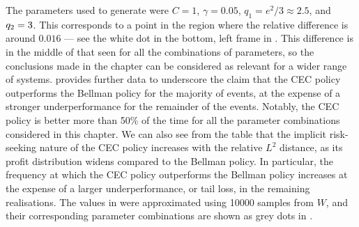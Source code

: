 \documentclass[main.tex]{subfiles}
\begin{document}
The parameters used to generate 
were $C=1$, $\gamma=0.05$, $q_1=e^2/3\approx2.5$, and
$q_2=\nobreak3$. This corresponds to a point
in the region where the relative difference is around $0.016$ --- see the
white dot in the
bottom, left frame in .
This difference is in the middle of that seen for all the
combinations of parameters, so the conclusions made in the chapter
can be considered as relevant for a wider range of systems.
 provides further data to underscore
the claim that the CEC policy
outperforms the Bellman policy for the
majority of events, at the expense of a stronger underperformance
for the remainder of the events. Notably, the CEC policy is better
more than 50\% of the time for all the parameter
combinations considered in this chapter.
We can also see from the table that the implicit risk-seeking nature
of the CEC policy increases with
the relative $L^2$ distance, as its profit distribution widens compared to
the Bellman policy.
In particular, the frequency at which the CEC policy
outperforms the Bellman policy increases at the expense of a larger
underperformance, or tail loss, in the remaining realisations.
The values in  were approximated using \num{10000} samples
from $W$, and their corresponding parameter combinations are shown as
grey dots in .
\end{document}
